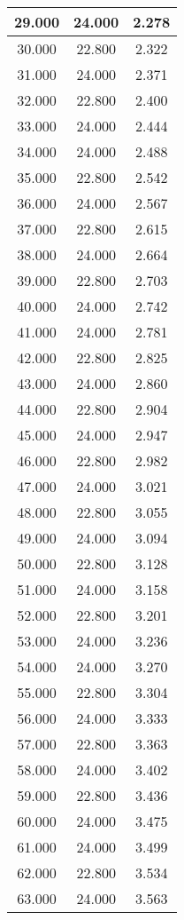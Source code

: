 \documentclass[11pt,a4paper]{jsarticle}
\begin{document}
\begin{center}
\begin{longtable}{|c|c|c|}
29.000	 & 24.000&  2.278 \\ \hline
30.000	 & 22.800&  2.322 \\ \hline
31.000	 & 24.000&  2.371 \\ \hline
32.000	 & 22.800&  2.400 \\ \hline
33.000	 & 24.000&  2.444 \\ \hline
34.000	 & 24.000&  2.488 \\ \hline
35.000	 & 22.800&  2.542 \\ \hline
36.000	 & 24.000&  2.567 \\ \hline
37.000	 & 22.800&  2.615 \\ \hline
38.000	 & 24.000&  2.664 \\ \hline
39.000	 & 22.800&  2.703 \\ \hline
40.000	 & 24.000&  2.742 \\ \hline
41.000	 & 24.000&  2.781 \\ \hline
42.000	 & 22.800&  2.825 \\ \hline
43.000	 & 24.000&  2.860 \\ \hline
44.000	 & 22.800&  2.904 \\ \hline
45.000	 & 24.000&  2.947 \\ \hline
46.000	 & 22.800&  2.982 \\ \hline
47.000	 & 24.000&  3.021 \\ \hline
48.000	 & 22.800&  3.055 \\ \hline
49.000	 & 24.000&  3.094 \\ \hline
50.000	 & 22.800&  3.128 \\ \hline
51.000	 & 24.000&  3.158 \\ \hline
52.000	 & 22.800&  3.201 \\ \hline
53.000	 & 24.000&  3.236 \\ \hline
54.000	 & 24.000&  3.270 \\ \hline
55.000	 & 22.800&  3.304 \\ \hline
56.000	 & 24.000&  3.333 \\ \hline
57.000	 & 22.800&  3.363 \\ \hline
58.000	 & 24.000&  3.402 \\ \hline
59.000	 & 22.800&  3.436 \\ \hline
60.000	 & 24.000&  3.475 \\ \hline
61.000	 & 24.000&  3.499 \\ \hline
62.000	 & 22.800&  3.534 \\ \hline
63.000	 & 24.000&  3.563 \\ \hline

\end{longtable}
\end{center}
\end{document}

